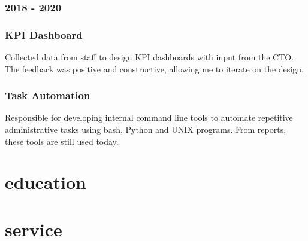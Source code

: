 \documentclass{article}
\begin{document}
\subsubsection{ 2018 - 2020 }

\subsubsection{ KPI Dashboard }

Collected data from staff to design KPI dashboards with input from the CTO. The feedback was positive and constructive, allowing me to iterate on the design.

\subsubsection{ Task Automation }

Responsible for developing internal command line tools to automate repetitive administrative tasks using bash, Python and UNIX programs. From reports, these tools are still used today.

\section{education}

\section{service}
\end{document}
